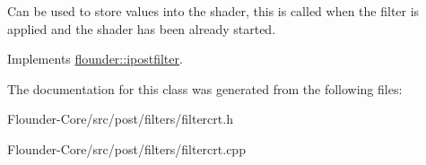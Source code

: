 Can be used to store values into the shader, this is called when the filter is applied and the shader has been already started. 



Implements \hyperlink{classflounder_1_1ipostfilter_a9b658b4672718d5ac36539875bde722e}{flounder\+::ipostfilter}.



The documentation for this class was generated from the following files\+:\begin{DoxyCompactItemize}
\item 
Flounder-\/\+Core/src/post/filters/filtercrt.\+h\item 
Flounder-\/\+Core/src/post/filters/filtercrt.\+cpp\end{DoxyCompactItemize}
